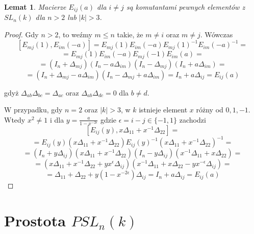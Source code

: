\documentclass[licencjacka]{pracamgr}
\newtheorem{lemma}{Lemat}[section]
\begin{document}
\begin{lemma}\label{lemma_Eij_are_commutants}
  Macierze $E_{i j}(a)$ dla $i \ne j$ są komutantami pewnych elementów z $SL_n(k)$ dla $n > 2$ lub $|k| > 3$.
\end{lemma}
\begin{proof}
  Gdy $n > 2$, to weźmy $m \le n$ takie, że $m \ne i$ oraz $m \ne j$. Wówczas
  $$ [ E_{m j}(1), E_{i m}(-a) ] = E_{m j}(1) E_{i m}(-a) E_{m j}(1)^{-1} E_{i m}(-a) ^{-1} = $$
  $$ = E_{m j}(1) E_{i m}(-a) E_{m j}(-1) E_{i m}(a) = $$
  $$ = (I_n + \Delta_{m j})(I_n -a \Delta_{i m})(I_n - \Delta_{m j}) (I_n + a \Delta_{i m}) = $$
  $$ = (I_n + \Delta_{m j} - a \Delta_{i m}) (I_n - \Delta_{m j} + a \Delta_{i m}) = I_n + a \Delta_{i j} = E_{i j}(a)$$

  gdyż $\Delta_{a b} \Delta_{b c} = \Delta_{a c}$ oraz $\Delta_{a b} \Delta_{d c} = 0$ dla $b \ne d$.

  W przypadku, gdy $n = 2$ oraz $|k| > 3$, w $k$ istnieje element $x$ różny od $0, 1, -1$.
  Wtedy $x^2 \ne 1$ i dla $y = \frac{a}{1 - x^{-2\epsilon}}$ gdzie $\epsilon = i - j \in \{-1, 1\}$ zachodzi
  $$ [ E_{i j}(y), x \Delta_{1 1} + x^{-1} \Delta_{2 2}] = $$
  $$ = E_{i j}(y)(x \Delta_{1 1} + x^{-1} \Delta_{2 2}) E_{i j}(y)^{-1} (x \Delta_{1 1} + x^{-1} \Delta_{2 2})^{-1} = $$
  $$ = (I_n + y \Delta_{i j})(x \Delta_{1 1} + x^{-1} \Delta_{2 2}) (I_n -y \Delta_{i j}) (x^{-1} \Delta_{1 1} + x \Delta_{2 2}) = $$
  $$ = (x \Delta_{1 1} + x^{-1} \Delta_{2 2} + y x^\epsilon \Delta_{i j}) (x^{-1} \Delta_{1 1} + x \Delta_{2 2} - y x^{-\epsilon} \Delta_{i j}) = $$
  $$ = \Delta_{1 1} + \Delta_{2 2} + y (1-x^{-2\epsilon}) \Delta_{i j}= I_n + a \Delta_{i j} = E_{i j}(a) $$
\end{proof}


\section{Prostota $PSL_n(k)$}
\end{document}
